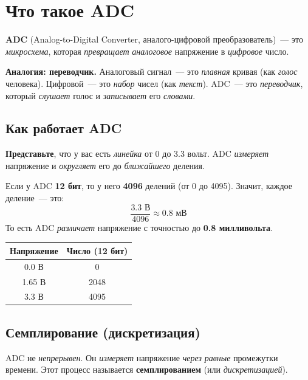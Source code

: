 \section{Что такое ADC}
\label{sec:adc-what}

\textbf{ADC} (Analog-to-Digital Converter, аналого-цифровой
преобразователь)~--- это \emph{микросхема}, которая
\emph{превращает} \emph{аналоговое} напряжение в
\emph{цифровое} число.

\begin{keybox}
\textbf{Аналогия: переводчик.} Аналоговый сигнал~--- это
\emph{плавная} кривая (как \emph{голос} человека).
Цифровой~--- это \emph{набор} чисел (как \emph{текст}).
ADC~--- это \emph{переводчик}, который \emph{слушает}
голос и \emph{записывает} его \emph{словами}.
\end{keybox}

\subsection{Как работает ADC}

\textbf{Представьте}, что у вас есть \emph{линейка} от
\num{0} до \num{3.3} вольт. ADC \emph{измеряет} напряжение
и \emph{округляет} его до \emph{ближайшего} деления.

Если у ADC \textbf{12 бит}, то у него \textbf{4096}
делений (от \num{0} до \num{4095}). Значит, каждое деление~---
это:
\[
\frac{3.3 \text{ В}}{4096} \approx 0.8 \text{ мВ}
\]
То есть ADC \emph{различает} напряжение с точностью до
\textbf{0.8 милливольта}.

\begin{center}
\begin{tabular}{|c|c|}
\hline
\textbf{Напряжение} & \textbf{Число (12 бит)} \\
\hline
\num{0.0} В & \num{0} \\
\num{1.65} В & \num{2048} \\
\num{3.3} В & \num{4095} \\
\hline
\end{tabular}
\end{center}

\subsection{Семплирование (дискретизация)}

ADC не \emph{непрерывен}. Он \emph{измеряет} напряжение
\emph{через} \emph{равные} промежутки времени. Этот процесс
называется \textbf{семплированием} (или \emph{дискретизацией}).


